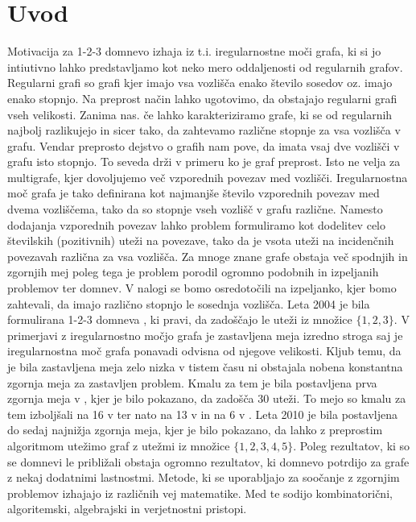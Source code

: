 \documentclass[12pt,a4paper,twoside]{article}
\theoremstyle{definition} %
\theoremstyle{plain} %
\numberwithin{equation}{section}  %
\begin{document}
\section{Uvod}
Motivacija za 1-2-3 domnevo izhaja iz t.i. iregularnostne moči grafa, ki si jo intiutivno lahko predstavljamo kot neko mero oddaljenosti od regularnih grafov. Regularni grafi so grafi kjer imajo vsa vozlišča enako število sosedov oz. imajo enako stopnjo. Na preprost način lahko ugotovimo, da obstajajo regularni grafi vseh velikosti. Zanima nas. če lahko karakteriziramo grafe, ki se od regularnih najbolj razlikujejo in sicer tako, da zahtevamo različne stopnje za vsa vozlišča v grafu. Vendar preprosto dejstvo o grafih nam pove, da imata vsaj dve vozlišči v grafu isto stopnjo. To seveda drži v primeru ko je graf preprost. Isto ne velja za multigrafe, kjer dovoljujemo več vzporednih povezav med vozlišči. Iregularnostna moč grafa je tako definirana kot najmanjše število vzporednih povezav med dvema vozliščema, tako da so stopnje vseh vozlišč v grafu različne.  Namesto dodajanja vzporednih povezav lahko problem formuliramo kot dodelitev celo številskih (pozitivnih) uteži na povezave, tako da je vsota uteži na incidenčnih povezavah različna za vsa vozlišča. Za mnoge znane grafe obstaja več spodnjih in zgornjih mej poleg tega je problem porodil ogromno podobnih in izpeljanih problemov ter domnev.  V nalogi se bomo osredotočili na izpeljanko, kjer bomo zahtevali, da imajo različno stopnjo le sosednja vozlišča.  Leta 2004 je bila formulirana 1-2-3 domneva \cite{base}, ki pravi, da zadoščajo le uteži iz množice $\{1,2,3\}$. V primerjavi z iregularnostno močjo grafa je zastavljena meja izredno stroga saj je iregularnostna moč grafa ponavadi odvisna od njegove velikosti. Kljub temu, da je bila zastavljena meja zelo nizka v tistem času ni obstajala nobena konstantna zgornja meja za zastavljen problem. Kmalu za tem je bila postavljena prva zgornja meja v \cite{}, kjer je bilo pokazano, da zadošča 30 uteži. To mejo so kmalu za tem izboljšali na 16 v \cite{} ter nato na 13 v \cite{} in na 6 v \cite{}. Leta 2010 je bila postavljena do sedaj najnižja zgornja meja, kjer je bilo pokazano, da lahko z preprostim algoritmom utežimo graf z utežmi iz množice $\{1,2,3,4,5\}$. Poleg rezultatov, ki so se domnevi le približali obstaja ogromno rezultatov, ki domnevo potrdijo za grafe z nekaj dodatnimi lastnostmi.
Metode, ki se uporabljajo za soočanje z zgornjim problemov izhajajo iz različnih vej matematike. Med te sodijo kombinatorični, algoritemski, algebrajski in verjetnostni pristopi.
\end{document}

